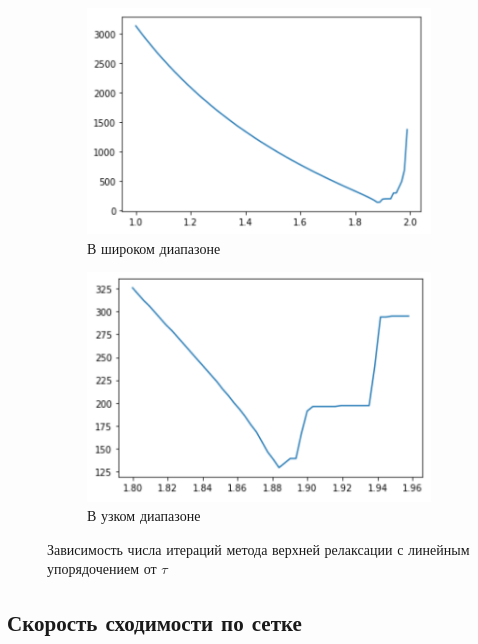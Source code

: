 \documentclass[report , a4paper, onecolumn, 12pt]{article}
\begin{document}
\begin{figure}[]
    \centering
    \begin{subfigure}{0.5\textwidth}
    \includegraphics[width=1\textwidth]{taus_linear1}
    \caption{В широком диапазоне}
    \end{subfigure}%
    \begin{subfigure}{0.5\textwidth}
    \includegraphics[width=1\textwidth]{taus_linear2}
    \caption{В узком диапазоне}
    \end{subfigure}
    \caption{Зависимость числа итераций метода верхней релаксации с линейным упорядочением от $\tau$}
    \label{fig:taus_linear}
\end{figure}

\subsection{Скорость сходимости по сетке}
\end{document}
